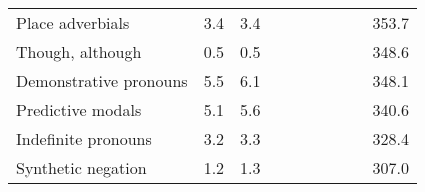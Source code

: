\begin{table}[!t]
\begin{tabular*}{\linewidth}{@{\extracolsep{\fill}}lrrrrrrrrr}
Place adverbials & 3.4 & 3.4 & {\cellcolor[HTML]{92C5DE}{\textcolor[HTML]{000000}{146\%}}} & {\cellcolor[HTML]{92C5DE}{\textcolor[HTML]{000000}{144\%}}} & {\cellcolor[HTML]{F7F7F7}{\textcolor[HTML]{000000}{101\%}}} & {\cellcolor[HTML]{F7F7F7}{\textcolor[HTML]{000000}{99\%}}} & {\cellcolor[HTML]{D1E5F0}{\textcolor[HTML]{000000}{118\%}}} & {\cellcolor[HTML]{D1E5F0}{\textcolor[HTML]{000000}{128\%}}} & 353.7 \\ 
Though, although & 0.5 & 0.5 & {\cellcolor[HTML]{F4A582}{\textcolor[HTML]{000000}{65\%}}} & {\cellcolor[HTML]{D1E5F0}{\textcolor[HTML]{000000}{129\%}}} & {\cellcolor[HTML]{B2182B}{\textcolor[HTML]{FFFFFF}{21\%}}} & {\cellcolor[HTML]{D6604D}{\textcolor[HTML]{FFFFFF}{28\%}}} & {\cellcolor[HTML]{FDDBC7}{\textcolor[HTML]{000000}{83\%}}} & {\cellcolor[HTML]{FDDBC7}{\textcolor[HTML]{000000}{90\%}}} & 348.6 \\ 
Demonstrative pronouns & 5.5 & 6.1 & {\cellcolor[HTML]{F4A582}{\textcolor[HTML]{000000}{55\%}}} & {\cellcolor[HTML]{D6604D}{\textcolor[HTML]{FFFFFF}{50\%}}} & {\cellcolor[HTML]{F4A582}{\textcolor[HTML]{000000}{71\%}}} & {\cellcolor[HTML]{FDDBC7}{\textcolor[HTML]{000000}{76\%}}} & {\cellcolor[HTML]{F7F7F7}{\textcolor[HTML]{000000}{99\%}}} & {\cellcolor[HTML]{F7F7F7}{\textcolor[HTML]{000000}{97\%}}} & 348.1 \\ 
Predictive modals & 5.1 & 5.6 & {\cellcolor[HTML]{F4A582}{\textcolor[HTML]{000000}{72\%}}} & {\cellcolor[HTML]{F4A582}{\textcolor[HTML]{000000}{57\%}}} & {\cellcolor[HTML]{F7F7F7}{\textcolor[HTML]{000000}{95\%}}} & {\cellcolor[HTML]{F7F7F7}{\textcolor[HTML]{000000}{106\%}}} & {\cellcolor[HTML]{D1E5F0}{\textcolor[HTML]{000000}{118\%}}} & {\cellcolor[HTML]{D1E5F0}{\textcolor[HTML]{000000}{111\%}}} & 340.6 \\ 
Indefinite pronouns & 3.2 & 3.3 & {\cellcolor[HTML]{F4A582}{\textcolor[HTML]{000000}{73\%}}} & {\cellcolor[HTML]{FDDBC7}{\textcolor[HTML]{000000}{77\%}}} & {\cellcolor[HTML]{FDDBC7}{\textcolor[HTML]{000000}{84\%}}} & {\cellcolor[HTML]{FDDBC7}{\textcolor[HTML]{000000}{83\%}}} & {\cellcolor[HTML]{92C5DE}{\textcolor[HTML]{000000}{156\%}}} & {\cellcolor[HTML]{92C5DE}{\textcolor[HTML]{000000}{149\%}}} & 328.4 \\ 
Synthetic negation & 1.2 & 1.3 & {\cellcolor[HTML]{D6604D}{\textcolor[HTML]{FFFFFF}{36\%}}} & {\cellcolor[HTML]{F4A582}{\textcolor[HTML]{000000}{51\%}}} & {\cellcolor[HTML]{D6604D}{\textcolor[HTML]{FFFFFF}{36\%}}} & {\cellcolor[HTML]{D6604D}{\textcolor[HTML]{FFFFFF}{36\%}}} & {\cellcolor[HTML]{F7F7F7}{\textcolor[HTML]{000000}{93\%}}} & {\cellcolor[HTML]{F7F7F7}{\textcolor[HTML]{000000}{91\%}}} & 307.0 \\ 

\end{tabular*}
\end{table}
